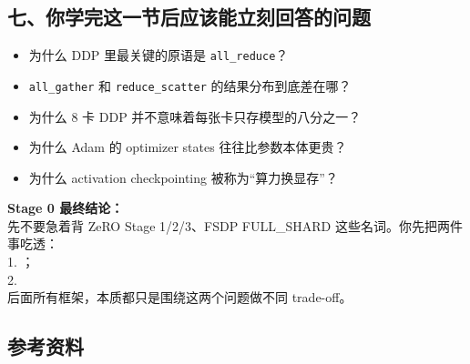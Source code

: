 \subsection{七、你学完这一节后应该能立刻回答的问题}

\begin{itemize}[leftmargin=1.5em]
  \item 为什么 DDP 里最关键的原语是 \texttt{all\_reduce}？
  \item \texttt{all\_gather} 和 \texttt{reduce\_scatter} 的结果分布到底差在哪？
  \item 为什么 8 卡 DDP 并不意味着每张卡只存模型的八分之一？
  \item 为什么 Adam 的 optimizer states 往往比参数本体更贵？
  \item 为什么 activation checkpointing 被称为“算力换显存”？
\end{itemize}

\begin{summarybox}
\textbf{Stage 0 最终结论：}\\
先不要急着背 ZeRO Stage 1/2/3、FSDP FULL\_SHARD 这些名词。你先把两件事吃透：\\
1. ；\\
2. \\
后面所有框架，本质都只是围绕这两个问题做不同 trade-off。
\end{summarybox}

\subsection{参考资料}

